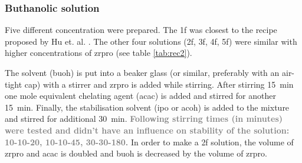 \documentclass[a4paper]{article}
\newcommand{\td}[1]{\textbf{\textcolor{red}{#1}}}
\newcommand{\me}[1]{\textbf{\textcolor{gray}{#1}}}
\newcommand{\ds}[1]{}
\newcommand{\ml}[1]{\SI{#1}{\milli\liter}}
\newcommand{\minutes}[1]{\SI{#1}{\minute}}
\begin{document}
\subsubsection{Buthanolic solution}
\label{sec:sol}
Five different concentration were prepared. 
The \gls{1f} 
was closest to the recipe proposed by Hu et. al. \cite{Hu2016}. 
The other four solutions (\gls{2f}, \gls{3f}, \gls{4f}, \gls{5f}) were similar with higher concentrations of \gls{zrpro} (see table \ref{tab:rec2}).

The solvent (\gls{buoh}) is put into a beaker glass (or similar, preferably with an air-tight cap) with a stirrer and \gls{zrpro} is added while stirring.  
After stirring \minutes{\ds{10 to }15} one mole equivalent chelating agent (\gls{acac}) is added and stirred for another \minutes{\ds{10 to }15}. 
Finally, the stabilisation solvent\cite{Hu2016} (\gls{ipo} or \gls{acoh}) is added to the mixture and stirred for additional \minutes{\ds{20-}30}. 
\me{Following stirring times (in minutes) were tested and didn't have an influence on stability of the solution: 10-10-20, 10-10-45, 30-30-180.}
In order to make a \gls{2f} solution, the volume of \gls{zrpro} and \gls{acac} is doubled and \gls{buoh} is decreased by the volume of \gls{zrpro}. 
\end{document}
